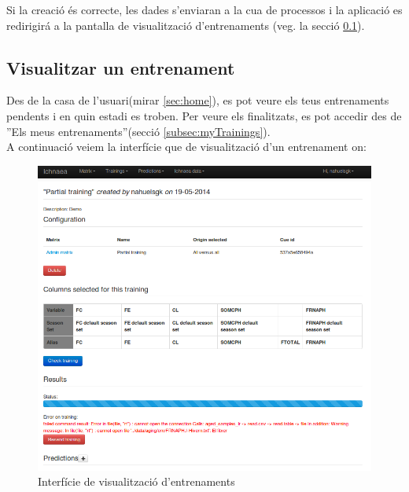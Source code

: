 Si la creaci\'{o} \'e{s} correcte, les dades s'enviaran a la cua de processos i la aplicaci\'{o} es redirigir\'{a} a la pantalla de visualitzaci\'{o} d'entrenaments (veg. la secció \ref{subsec:viewtraining}).

\subsection{Visualitzar un entrenament}
\label{subsec:viewtraining}
Des de la casa de l'usuari(mirar \ref{sec:home}), es pot veure els teus entrenaments pendents i en quin estadi es troben. Per veure els finalitzats, es pot accedir des de ''Els meus entrenaments''(secció \ref{subsec:myTrainings}).\\

A continuació veiem la interfície que de visualització d'un entrenament on:
\begin{figure}[h!]
  \centering
  \includegraphics[scale=0.5]{img/userguide/view_training_pending.png}
  \caption{Interfície de visualització d'entrenaments}
  \label{fig:viewTraining}
\end{figure}

